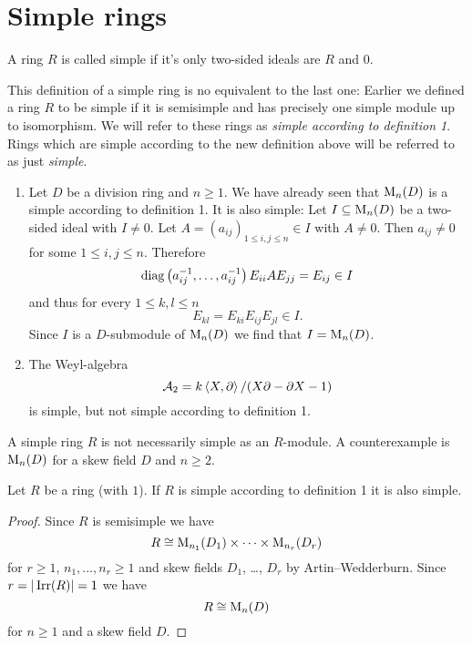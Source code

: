 \section{Simple rings}


\begin{defi}
 A ring $R$ is called simple if it’s only two-sided ideals are $R$ and $0$.
\end{defi}


\begin{warn}
 This definition of a simple ring is no equivalent to the last one: Earlier we defined a ring $R$ to be simple if it is semisimple and has precisely one simple module up to isomorphism. We will refer to these rings as \emph{simple according to definition 1}. Rings which are simple according to the new definition above will be referred to as just \emph{simple}.
\end{warn}


\begin{expls}
 \begin{enumerate}[label=\emph{\alph*)},leftmargin=*]
  \item
   Let $D$ be a division ring and $n \geq 1$. We have already seen that $\operatorname{M}_n(D)$ is a simple according to definition 1. It is also simple: Let $I \subseteq \operatorname{M}_n(D)$ be a two-sided ideal with $I \neq 0$. Let $A = (a_{ij})_{1 \leq i,j \leq n} \in I$ with $A \neq 0$. Then $a_{ij} \neq 0$ for some $1 \leq i,j \leq n$. Therefore
   \[
    \operatorname{diag}\left( a_{ij}^{-1}, \dotsc, a_{ij}^{-1} \right) E_{ii} A E_{jj} = E_{ij} \in I
   \]
   and thus for every $1 \leq k,l \leq n$
   \[
    E_{kl} = E_{ki} E_{ij} E_{jl} \in I.
   \]
   Since $I$ is a $D$-submodule of $\operatorname{M}_n(D)$ we find that $I = \operatorname{M}_n(D)$.
  \item
   The Weyl-algebra
   \[
    \mathcal{A}_2 = k \left\langle X,\partial \right\rangle/(X \partial - \partial X - 1)
   \]
   is simple, but not simple according to definition 1.
 \end{enumerate}
\end{expls}


\begin{warn}
 A simple ring $R$ is not necessarily simple as an $R$-module. A counterexample is $\operatorname{M}_n(D)$ for a skew field $D$ and $n \geq 2$.
\end{warn}


\begin{lem}
 Let $R$ be a ring (with $1$). If $R$ is simple according to definition 1 it is also simple.
\end{lem}
\begin{proof}
 Since $R$ is semisimple we have
 \[
  R \cong \operatorname{M}_{n_1}(D_1) \times \dotsb \times \operatorname{M}_{n_r}(D_r)
 \]
 for $r \geq 1$, $n_1, \dotsc, n_r \geq 1$ and skew fields $D_1$, \dots, $D_r$ by Artin--Wedderburn. Since $r = |\operatorname{Irr}(R)| = 1$ we have
 \[
  R \cong \operatorname{M}_n(D)
 \]
 for $n \geq 1$ and a skew field $D$.
\end{proof}


